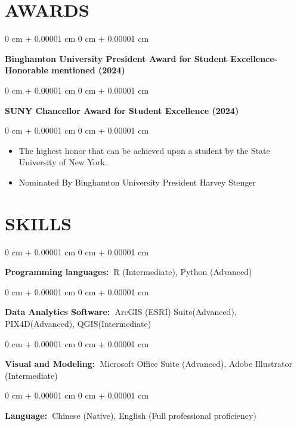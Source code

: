 \documentclass[10pt, letterpaper]{article}
\newenvironment{highlights}{
    \begin{itemize}[
        topsep=0.10 cm,
        parsep=0.10 cm,
        partopsep=0pt,
        itemsep=0pt,
        leftmargin=0 cm + 10pt
    ]
}{
    \end{itemize}
} %
\newenvironment{onecolentry}{
    \begin{adjustwidth}{
        0 cm + 0.00001 cm
    }{
        0 cm + 0.00001 cm
    }
}{
    \end{adjustwidth}
} %
\begin{document}
    \section{AWARDS}

        \begin{onecolentry}
                    \textbf{\textbf{Binghamton University President Award for Student Excellence-Honorable mentioned (2024)}}
        \end{onecolentry}

                \begin{onecolentry}
                    \textbf{\textbf{\textbf{SUNY Chancellor Award for Student Excellence (2024)}
}}
        \end{onecolentry}
                \vspace{0.10 cm}
        \begin{onecolentry}
            \begin{highlights}
                \item The highest honor that can be achieved upon a student by the State University of New York.
                \item Nominated By Binghamton University President Harvey Stenger
            \end{highlights}
        \end{onecolentry}








    \section{SKILLS}




        \begin{onecolentry}
            \textbf{\textbf{Programming languages: }}R (Intermediate), Python (Advanced)\textbf{ }
        \end{onecolentry}

        \vspace{0.1 cm}

        \begin{onecolentry}
            \textbf{\textbf{Data Analytics Software: }}ArcGIS (ESRI) Suite(Advanced), PIX4D(Advanced), QGIS(Intermediate)

        \end{onecolentry}

         \vspace{0.1 cm}

        \begin{onecolentry}
                    \textbf{\textbf{\textbf{Visual and Modeling: }}}Microsoft Office Suite (Advanced), Adobe Illustrator (Intermediate)

        \end{onecolentry}

         \vspace{0.1 cm}

        \begin{onecolentry}
                    \textbf{\textbf{\textbf{\textbf{Language: }}}}Chinese (Native), English (Full professional proficiency)

        \end{onecolentry}
\end{document}
